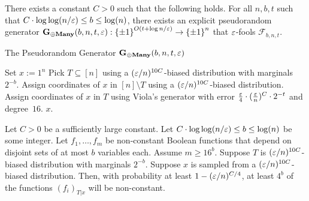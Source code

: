 \begin{lemma}\label{lemma:Gb}
There exists a constant $C>0$ such that the following holds.
For all $n,b,t$ such that  $C\cdot \log\log(n/\varepsilon) \le b \le \log(n)$, there exists an explicit pseudorandom generator $\mathbf{G_{\oplus Many}}(b,n,t,\varepsilon):{\{\pm1\}}^{O(t + \log n/\varepsilon)} \to {\{\pm1\}}^n$ that $\varepsilon$-fools $\mathcal{F}_{b,n,t}$.
\end{lemma}

\begin{algorithm}[H]
\caption{The Pseudorandom Generator $\mathbf{G_{\oplus Many}}(b,n,t,\varepsilon)$} 
\begin{algorithmic}[1]
\State Set $x:= 1^n$
\State Pick $T\subseteq [n]$ using a $(\varepsilon/n)^{10C}$-biased distribution with marginals $2^{-b}$.
\State Assign coordinates of $x$ in $[n]\setminus T$ using a $(\varepsilon/n)^{10C}$-biased distribution.
\State Assign coordinates of $x$ in $T$ using Viola's generator with error $\frac{\varepsilon}{4} \cdot (\frac{\varepsilon}{n})^{C} \cdot 2^{-t}$ and degree~$16$.
\State \Return $x$.
\end{algorithmic}\label{test:1}
\end{algorithm}

\begin{lemma}\label{lemma:aggressive-real}
Let $C>0$ be a sufficiently large constant.
Let $C\cdot \log\log(n/\varepsilon) \le b \le \log(n)$ be some integer.
Let $f_1, \ldots, f_m$ be non-constant Boolean functions that depend on disjoint sets of at most $b$ variables each.
Assume $m \ge 16^b$.
Suppose $T$ is $(\varepsilon/n)^{10C}$-biased distribution with marginals $2^{-b}$.
Suppose $x$ is sampled from a $(\varepsilon/n)^{10C}$-biased distribution.
Then, with  probability at least $1-(\varepsilon/n)^{C/4}$, at least $4^b$ of the functions $(f_i)_{T|x}$ will be non-constant. 
\end{lemma}

